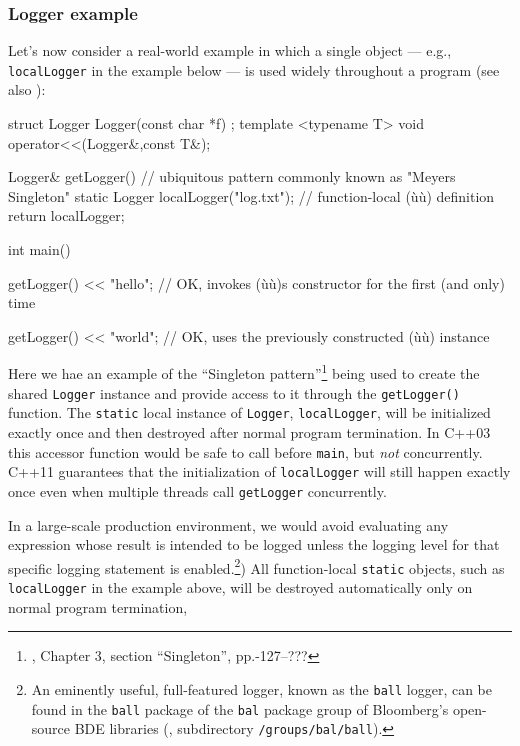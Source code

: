 \subsubsection[Logger example]{Logger example}\label{logger-example}

Let's now consider a 
real-world example in which a single object --- e.g.,
\lstinline!localLogger! in the example below --- is used widely throughout a program (see
also ):

\begin{emcppshiddenlisting}[emcppsbatch=e3]
struct Logger {
  Logger(const char *f) {}
};
template <typename T>
void operator<<(Logger&,const T&);
\end{emcppshiddenlisting}
\begin{emcppslisting}[emcppsbatch=e3]
Logger& getLogger()  // ubiquitous pattern commonly known as "Meyers Singleton"
{
    static Logger localLogger("log.txt");  // function-local (ù{}ù) definition
    return localLogger;
}

int main()
{
    getLogger() << "hello";
        // OK, invokes (ù{}ù)s constructor for the first (and only) time

    getLogger() << "world";
        // OK, uses the previously constructed (ù{}ù) instance
}
\end{emcppslisting}

Here we hae an example of the ``Singleton pattern''\footnote{\cite{gamma95}, Chapter 3, section
``Singleton'', pp.-127--???} being used to create the shared \lstinline!Logger! instance
and provide access to it through the \lstinline!getLogger()! function.  The \lstinline!static! local
instance of \lstinline!Logger!, \lstinline!localLogger!, will be initialized exactly once and then
destroyed after normal program termination.  In C++03 this accessor function would be safe to call
before \lstinline!main!, but \emph{not} concurrently.  C++11 guarantees that the initialization
of \lstinline!localLogger! will still happen exactly once even when multiple threads call
\lstinline!getLogger! concurrently.

\noindent In a large-scale production environment, we would avoid evaluating any expression whose result is
intended to be logged unless the logging level for that specific logging statement is enabled.{\cprotect\footnote{An
eminently useful, full-featured logger, known as the \texttt{ball} logger, can be found in the
\texttt{ball} package of the \texttt{bal} package group of Bloomberg's open-source
  BDE libraries (\cite{bde14}, subdirectory \texttt{/groups/bal/ball}).}}) All function-local \lstinline!static! objects, such as \lstinline!localLogger!
in the example above, will be destroyed automatically only on normal
program termination, 

